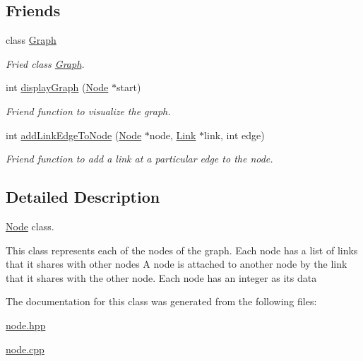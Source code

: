 \subsection*{Friends}
\begin{DoxyCompactItemize}
\item 
\hypertarget{classNode_afab89afd724f1b07b1aaad6bdc61c47a}{class \hyperlink{classNode_afab89afd724f1b07b1aaad6bdc61c47a}{Graph}}\label{classNode_afab89afd724f1b07b1aaad6bdc61c47a}

\begin{DoxyCompactList}\small\item\em Fried class \hyperlink{classGraph}{Graph}. \end{DoxyCompactList}\item 
\hypertarget{classNode_a6a3a35dc10c66f0658f4003074059fcd}{int \hyperlink{classNode_a6a3a35dc10c66f0658f4003074059fcd}{display\-Graph} (\hyperlink{classNode}{Node} $\ast$start)}\label{classNode_a6a3a35dc10c66f0658f4003074059fcd}

\begin{DoxyCompactList}\small\item\em Friend function to visualize the graph. \end{DoxyCompactList}\item 
\hypertarget{classNode_a1cccce22df97e21e1e0e0cd3ca6526b0}{int \hyperlink{classNode_a1cccce22df97e21e1e0e0cd3ca6526b0}{add\-Link\-Edge\-To\-Node} (\hyperlink{classNode}{Node} $\ast$node, \hyperlink{classLink}{Link} $\ast$link, int edge)}\label{classNode_a1cccce22df97e21e1e0e0cd3ca6526b0}

\begin{DoxyCompactList}\small\item\em Friend function to add a link at a particular edge to the node. \end{DoxyCompactList}\end{DoxyCompactItemize}


\subsection{Detailed Description}
\hyperlink{classNode}{Node} class. 

This class represents each of the nodes of the graph. Each node has a list of links that it shares with other nodes A node is attached to another node by the link that it shares with the other node. Each node has an integer as its data 

The documentation for this class was generated from the following files\-:\begin{DoxyCompactItemize}
\item 
\hyperlink{node_8hpp}{node.\-hpp}\item 
\hyperlink{node_8cpp}{node.\-cpp}\end{DoxyCompactItemize}

